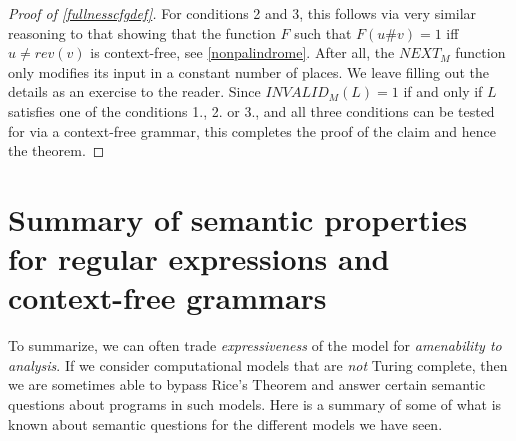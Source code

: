 \begin{proof}[Proof of \cref{fullnesscfgdef}]
For conditions 2 and 3, this follows via very similar reasoning to that
showing that the function \(F\) such that \(F(u\#v)=1\) iff
\(u \neq rev(v)\) is context-free, see \cref{nonpalindrome}. After all,
the \(\ensuremath{\mathit{NEXT}}_M\) function only modifies its input in
a constant number of places. We leave filling out the details as an
exercise to the reader. Since \(\ensuremath{\mathit{INVALID}}_M(L)=1\)
if and only if \(L\) satisfies one of the conditions 1., 2. or 3., and
all three conditions can be tested for via a context-free grammar, this
completes the proof of the claim and hence the theorem.

\end{proof}

\section{Summary of semantic properties for regular expressions and
context-free grammars}\label{Summary-of-semantic-prope}

To summarize, we can often trade \emph{expressiveness} of the model for
\emph{amenability to analysis}. If we consider computational models that
are \emph{not} Turing complete, then we are sometimes able to bypass
Rice's Theorem and answer certain semantic questions about programs in
such models. Here is a summary of some of what is known about semantic
questions for the different models we have seen.

